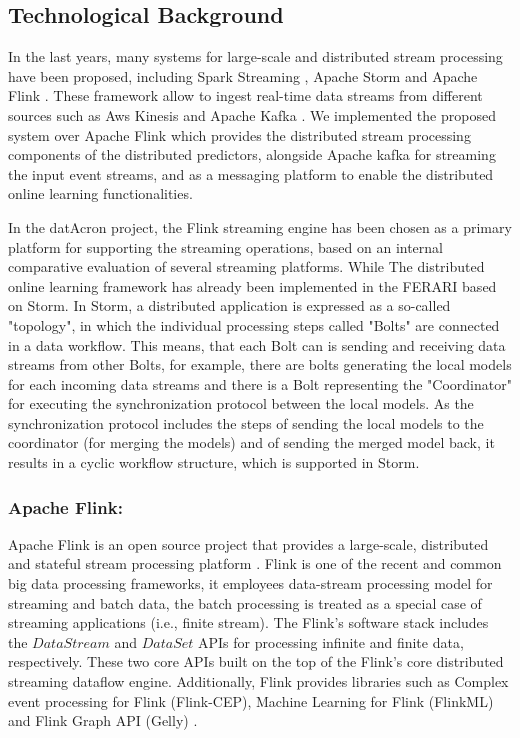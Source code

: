 \subsection{Technological Background}
In the last years, many systems for large-scale and distributed stream processing have been proposed, including Spark Streaming \cite{Spark},  Apache Storm \cite{Storm} and Apache Flink \cite{Flink}. These framework allow to ingest real-time data streams from different sources such as  Aws Kinesis \cite{Kinesis} and Apache Kafka \cite{Kafka}. We implemented the proposed system over Apache Flink which provides the distributed stream processing components of the distributed predictors, alongside  Apache kafka for streaming the input event streams, and as a messaging platform to enable the distributed online learning functionalities.


\par In the datAcron project, the Flink streaming engine has been chosen as a primary platform for supporting the streaming operations, based on an internal comparative evaluation of several streaming platforms. While The distributed online learning framework has already been implemented in the FERARI \cite{flouris2016ferari}  based on Storm. In Storm, a distributed application is expressed as a so-called "topology", in which the individual processing steps called "Bolts" are connected
in a data workflow. This means, that each Bolt can is sending and receiving data streams from other Bolts, for example, there are bolts generating
the local models for each incoming data streams and there is a Bolt representing the "Coordinator" for executing the synchronization protocol between
the local models. As the synchronization protocol includes the steps of sending the local models to the coordinator (for merging the models) and of sending
the merged model back, it results in a cyclic workflow structure, which is supported in Storm. 

\subsubsection*{Apache Flink:\\}

\par Apache Flink is an open source project that provides a large-scale, distributed and stateful stream processing platform \cite{carbone2015apache}. Flink is one of the recent and common big data processing frameworks, it employees data-stream processing model for streaming and batch data, the batch processing is treated as a special case of streaming applications (i.e., finite stream). The Flink's software stack includes the  $DataStream$ and $DataSet$ APIs for processing infinite and finite data, respectively. These two core APIs built on the top of the Flink's core distributed streaming dataflow engine. Additionally, Flink provides libraries such as Complex event processing for Flink (Flink-CEP), Machine Learning for Flink (FlinkML) and Flink Graph API (Gelly) \cite{carbone2015apache}.

